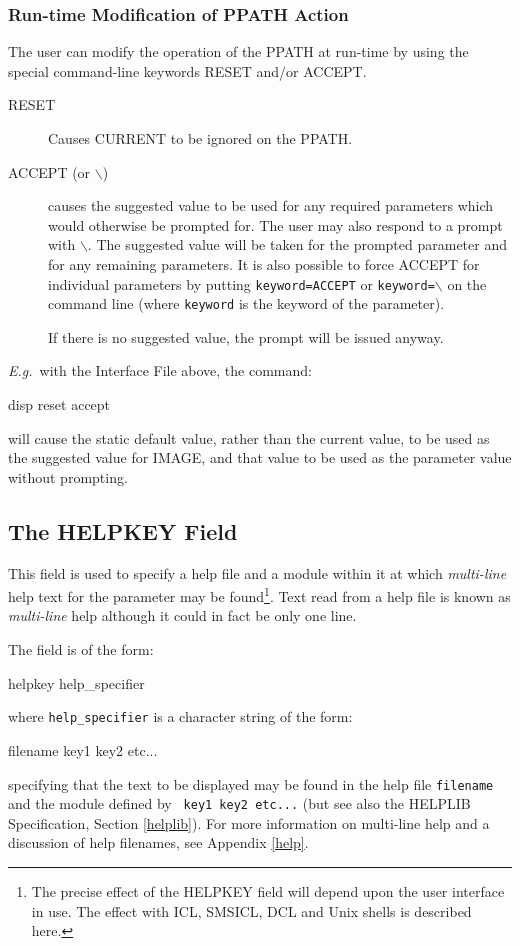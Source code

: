 \documentclass[twoside,11pt,nolof]{starlink}
\begin{document}
\subsubsection*{Run-time Modification of PPATH Action}
The user can modify the operation of the PPATH at run-time by using the
special command-line keywords RESET and/or ACCEPT.
\begin{description}
\item[RESET] Causes CURRENT to be ignored on the PPATH.
\item[ACCEPT (or $\backslash$)] causes the suggested value to be used for any
required parameters which would otherwise be prompted for.
The user may also respond to a prompt with
\texttt{$\backslash$}. The suggested value will be taken for the prompted parameter and
for any remaining parameters.
It is also possible to force ACCEPT for individual parameters by putting
\texttt{keyword=ACCEPT} or \texttt{keyword=$\backslash$} on the command line (where
\texttt{keyword} is the keyword of the parameter).

If there is no suggested value, the prompt will be issued anyway.
\end{description}
\emph{E.g.}\ with the Interface File above, the command:
\begin{terminalv}
disp reset accept
\end{terminalv}
will cause the static default value, rather than the current value,
to be used as the suggested value for IMAGE, and that value to be used as the
parameter value without prompting.

\subsection{The HELPKEY Field}

This field is used to specify a help file and a module within it at which
\emph{multi-line} help text for the parameter may be found\footnote{
The precise effect of the HELPKEY field will depend upon the user interface
in use.
The effect with ICL, SMSICL, DCL and Unix shells is described here.}.
Text read from a help file is known as \emph{multi-line} help although it could
in fact be only one line.

The field is of the form:
\begin{terminalv}
helpkey help_specifier
\end{terminalv}
where \texttt{help\_specifier} is a character string of the form:
\begin{terminalv}
filename key1 key2 etc...
\end{terminalv}
specifying that the text to be displayed may be found in the help file
\texttt{filename} and the module defined by \texttt{ key1 key2 etc...} (but see
also the HELPLIB Specification, Section \ref{helplib}).
For more information on multi-line help and a discussion of help filenames,
see Appendix \ref{help}.
\end{document}
